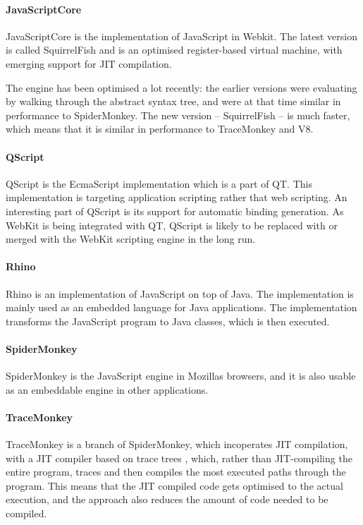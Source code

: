 \documentclass[11pt]{report}
\begin{document}
\paragraph{JavaScriptCore} 
JavaScriptCore is the implementation of JavaScript in Webkit.
The latest version is called SquirrelFish and is an optimised register-based virtual machine,
with emerging support for JIT compilation.

The engine has been optimised a lot recently: the earlier versions were evaluating by walking through the abstract syntax tree, and were at that time similar in performance to SpiderMonkey.
The new version -- SquirrelFish -- is much faster, which means that it is similar in performance to TraceMonkey and V8.

\paragraph{QScript}
QScript is the EcmaScript implementation which is a part of QT. This implementation is targeting application scripting rather that web scripting. An interesting part of QScript is its support for automatic binding generation. As WebKit is being integrated with QT, QScript is likely to be replaced with or merged with the WebKit scripting engine in the long run.

\paragraph{Rhino}
Rhino is an implementation of JavaScript on top of Java. The implementation is mainly used as an embedded language for Java applications. The implementation transforms the JavaScript program to Java classes, which is then executed.

\paragraph{SpiderMonkey}
\label{spidermonkey}
SpiderMonkey \cite{spidermonkey} is the JavaScript engine in Mozillas browsers, and it is also usable as an embeddable engine in other applications. %

\paragraph{TraceMonkey} 
TraceMonkey is a branch of SpiderMonkey, which incoperates JIT compilation, with a JIT compiler based on trace trees \cite{trace-tree}, 
which, rather than JIT-compiling the entire program,
traces and then compiles the most executed paths through the program.
This means that the JIT compiled code gets optimised to the actual execution,
and the approach also reduces the amount of code needed to be compiled.
\end{document}
